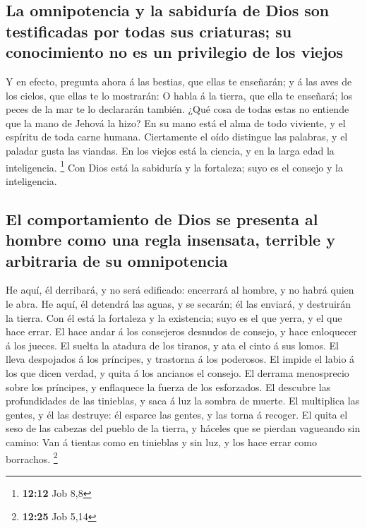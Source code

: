 \hypertarget{la-omnipotencia-y-la-sabiduruxeda-de-dios-son-testificadas-por-todas-sus-criaturas-su-conocimiento-no-es-un-privilegio-de-los-viejos}{%
\subsection{La omnipotencia y la sabiduría de Dios son testificadas por
todas sus criaturas; su conocimiento no es un privilegio de los
viejos}\label{la-omnipotencia-y-la-sabiduruxeda-de-dios-son-testificadas-por-todas-sus-criaturas-su-conocimiento-no-es-un-privilegio-de-los-viejos}}

 Y en efecto, pregunta ahora á las bestias, que ellas te
enseñarán; y á las aves de los cielos, que ellas te lo mostrarán:
 O habla á la tierra, que ella te enseñará; los peces de
la mar te lo declararán también.  ¿Qué cosa de todas estas
no entiende que la mano de Jehová la hizo?  En su mano
está el alma de todo viviente, y el espíritu de toda carne humana.
 Ciertamente el oído distingue las palabras, y el paladar
gusta las viandas.  En los viejos está la ciencia, y en
la larga edad la inteligencia. \footnote{\textbf{12:12} Job 8,8}
 Con Dios está la sabiduría y la fortaleza; suyo es el
consejo y la inteligencia.

\hypertarget{el-comportamiento-de-dios-se-presenta-al-hombre-como-una-regla-insensata-terrible-y-arbitraria-de-su-omnipotencia}{%
\subsection{El comportamiento de Dios se presenta al hombre como una
regla insensata, terrible y arbitraria de su
omnipotencia}\label{el-comportamiento-de-dios-se-presenta-al-hombre-como-una-regla-insensata-terrible-y-arbitraria-de-su-omnipotencia}}

 He aquí, él derribará, y no será edificado: encerrará al
hombre, y no habrá quien le abra.  He aquí, él detendrá
las aguas, y se secarán; él las enviará, y destruirán la tierra.
 Con él está la fortaleza y la existencia; suyo es el que
yerra, y el que hace errar.  El hace andar á los
consejeros desnudos de consejo, y hace enloquecer á los jueces.
 El suelta la atadura de los tiranos, y ata el cinto á
sus lomos.  El lleva despojados á los príncipes, y
trastorna á los poderosos.  El impide el labio á los que
dicen verdad, y quita á los ancianos el consejo.  El
derrama menosprecio sobre los príncipes, y enflaquece la fuerza de los
esforzados.  El descubre las profundidades de las
tinieblas, y saca á luz la sombra de muerte.  El
multiplica las gentes, y él las destruye: él esparce las gentes, y las
torna á recoger.  El quita el seso de las cabezas del
pueblo de la tierra, y háceles que se pierdan vagueando sin camino:
 Van á tientas como en tinieblas y sin luz, y los hace
errar como borrachos. \footnote{\textbf{12:25} Job 5,14}

